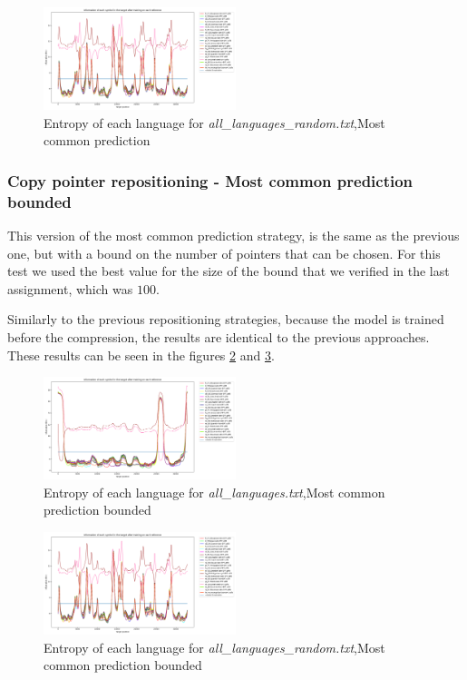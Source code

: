 \documentclass{article}
\begin{document}
\begin{figure}
    \centering
    \includegraphics[width=0.5\textwidth]{../results/all_languages_random/-r_m.png}
    \caption{Entropy of each language for \textit{all\_languages\_random.txt},Most common prediction}
    \label{fig:all_languages_random_r_m}
\end{figure}

\subsubsection{Copy pointer repositioning - Most common prediction bounded}
\label{subsubsec:results_locate_lang_most_common_prediction_bounded}

This version of the most common prediction strategy, is the same as the previous one, but with a bound on the number of pointers that can be chosen.
For this test we used the best value for the size of the bound that we verified in the last assignment, which was $100$.

Similarly to the previous repositioning strategies, because the model is trained before the compression, the results are identical to the previous approaches.
These results can be seen in the figures \ref{fig:all_languages_r_c} and \ref{fig:all_languages_random_r_c}.

\begin{figure}
    \centering
    \includegraphics[width=0.5\textwidth]{../results/all_languages/-r_c:100.png}
    \caption{Entropy of each language for \textit{all\_languages.txt},Most common prediction bounded}
    \label{fig:all_languages_r_c}
\end{figure}

\begin{figure}
    \centering
    \includegraphics[width=0.5\textwidth]{../results/all_languages_random/-r_c:100.png}
    \caption{Entropy of each language for \textit{all\_languages\_random.txt},Most common prediction bounded}
    \label{fig:all_languages_random_r_c}
\end{figure}
\end{document}
